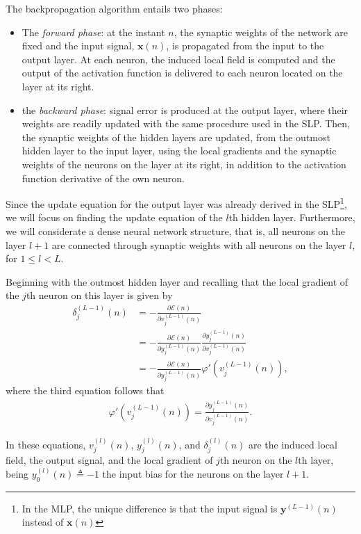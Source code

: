\documentclass[12pt,a4paper]{article}
\begin{document}
The backpropagation algorithm entails two phases:
\begin{itemize}
    \item The \emph{forward phase}: at the instant \(n\), the synaptic weights of the network are fixed and the input signal, \(\mathbf{x}(n)\), is propagated from the input to the output layer. At each neuron, the induced local field is computed and the output of the activation function is delivered to each neuron located on the layer at its right.
    \item the \emph{backward phase}: signal error is produced at the output layer, where their weights are readily updated with the same procedure used in the SLP. Then, the synaptic weights of the hidden layers are updated, from the outmost hidden layer to the input layer, using the local gradients and the synaptic weights of the neurons on the layer at its right, in addition to the activation function derivative of the own neuron. 
\end{itemize}

Since the update equation for the output layer was already derived in the SLP\footnote{In the MLP, the unique difference is that the input signal is \(\mathbf{y}^{(L-1)}(n)\) instead of \(\mathbf{x}(n)\)}, we will focus on finding the update equation of the \(l\)th hidden layer. Furthermore, we will considerate a dense neural network structure, that is, all neurons on the layer \(l+1\) are connected through synaptic weights with all neurons on the layer \(l\), for \(1\leq l < L\).

Beginning with the outmost hidden layer and recalling that the local gradient of the \(j\)th neuron on this layer is given by
\begin{align}
    \delta_j^{(L-1)} (n) & = - \frac{\partial \mathscr{E}(n)}{\partial v_{j}^{(L-1)}(n)} \nonumber \\
    & = - \frac{\partial \mathscr{E}(n)}{\partial y_{j}^{(L-1)}(n)} \frac{\partial y_{j}^{(L-1)}(n)}{\partial v_{j}^{(L-1)}(n)} \nonumber \nonumber \\
    & = - \frac{\partial \mathscr{E}(n)}{\partial y_{j}^{(L-1)}(n)} \varphi'(v_j^{(L-1)}(n)),
    \label{eq:local-gradient2}
\end{align}
where the third equation follows that
\begin{align}
    \varphi'(v_j^{(L-1)}(n)) = \frac{\partial y_{j}^{(L-1)}(n)}{\partial v_{j}^{(L-1)}(n)}.
\end{align}

In these equations, \(v_{j}^{(l)}(n)\), \(y_{j}^{(l)} (n)\), and \(\delta_j^{(l)} (n)\) are the induced local field, the output signal, and the local gradient of \(j\)th neuron on the \(l\)th layer, being \(y_{0}^{(l)} (n) \triangleq -1\) the input bias for the neurons on the layer \(l+1\).
\end{document}
